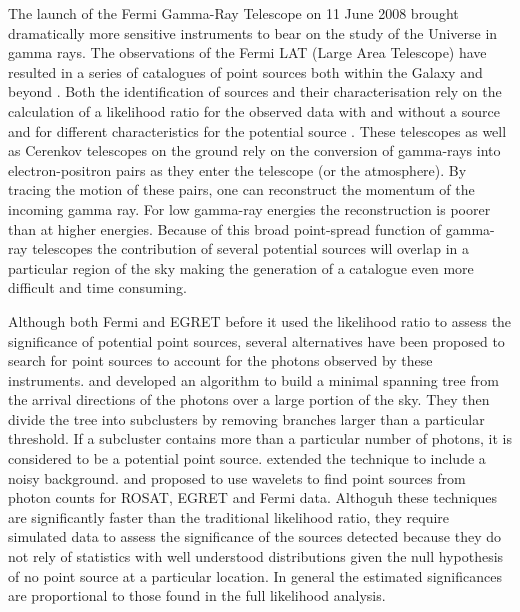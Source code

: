 \documentclass[useAMS,usenatbib]{mn2e}
\begin{document}
The launch of the Fermi Gamma-Ray Telescope on 11 June 2008 brought
dramatically more sensitive instruments to bear on the study of the
Universe in gamma rays.  The observations of the Fermi LAT (Large Area
Telescope) \citep[e.g.][]{2012ApJS..203....4A} have resulted in a
series of catalogues of point sources both within the Galaxy and
beyond \citep[e.g.][]{2010ApJS..188..405A,2011ApJ...743..171A,
  2012ApJS..199...31N,2013ApJS..208...17A,
  2013ApJS..209...34A,2015ApJS..218...23A}.  Both the identification
of sources and their characterisation rely on the calculation of a
likelihood ratio for the observed data with and without a source and
for different characteristics for the potential source
\citep{1979ApJ...228..939C,1992MNRAS.259..413S,1996ApJ...461..396M}.
These telescopes as well as Cerenkov telescopes on the ground rely on
the conversion of gamma-rays into electron-positron pairs as they
enter the telescope (or the atmosphere).  By tracing the motion of
these pairs, one can reconstruct the momentum of the incoming gamma
ray.  For low gamma-ray energies the reconstruction is poorer than at
higher energies.  Because of this broad point-spread function of
gamma-ray telescopes the contribution of several potential sources
will overlap in a particular region of the sky making the generation
of a catalogue even more difficult and time consuming.

Although both Fermi and EGRET before it used the likelihood ratio to
assess the significance of potential point sources, several
alternatives have been proposed to search for point sources to account
for the photons observed by these instruments.
\citet{2009arXiv0912.3843M} and \citet{2008MNRAS.383.1166C} developed an algorithm
to build a minimal spanning tree from the arrival directions of the
photons over a large portion of the sky.  They then divide the tree
into subclusters by removing branches larger than a particular
threshold.  If a subcluster contains more than a particular number of
photons, it is considered to be a potential point source.
\citet{2013Ap&SS.347..169C} extended the technique to include a noisy
background.
\citet{1997ApJ...483..350D,1997ApJ...483..370D} and \citet{2007AIPC..921..546C}
proposed to use wavelets to find point sources from photon counts for
ROSAT, EGRET and Fermi data.  Althoguh these techniques are
significantly faster than the traditional likelihood ratio, they
require simulated data to assess the significance of the sources
detected because they do not rely of statistics with well understood
distributions given the null hypothesis of no point source at a
particular location.  In general the estimated significances are
proportional to those found in the full likelihood analysis.
\end{document}
